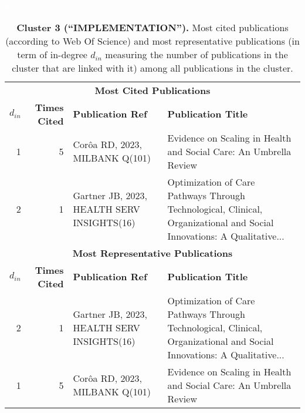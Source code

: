 \documentclass[a4paper,11pt]{report}
\begin{document}
\begin{landscape}
\begin{table}[!ht]
\caption*{{\bf Cluster 3 (``IMPLEMENTATION'').} Most cited publications (according to Web Of Science) and most representative publications (in term of in-degree $d_{in}$ measuring the number of publications in the cluster that are linked with it) among all publications in the cluster.}
\textcolor{white}{aa}\\
{\scriptsize\begin{tabular}{|r r p{7cm} p{17cm}|}
\hline
\multicolumn{4}{|c|}{{\bf Most Cited Publications}}\\
{\bf $d_{in}$} & {\bf Times Cited} & {\bf Publication Ref} & {\bf Publication Title} \\
1 & 5 & Corôa RD, 2023, MILBANK Q(101) & Evidence on Scaling in Health and Social Care: An Umbrella Review\\
2 & 1 & Gartner JB, 2023, HEALTH SERV INSIGHTS(16) & Optimization of Care Pathways Through Technological, Clinical, Organizational and Social Innovations: A Qualitative...\\
\hline
\hline
\multicolumn{4}{|c|}{{\bf Most Representative Publications}}\\
{\bf $d_{in}$} & {\bf Times Cited} & {\bf Publication Ref} & {\bf Publication Title} \\
2 & 1 & Gartner JB, 2023, HEALTH SERV INSIGHTS(16) & Optimization of Care Pathways Through Technological, Clinical, Organizational and Social Innovations: A Qualitative...\\
1 & 5 & Corôa RD, 2023, MILBANK Q(101) & Evidence on Scaling in Health and Social Care: An Umbrella Review\\
\hline
\end{tabular}
}
\end{table}

\clearpage


\end{landscape}
\end{document}

